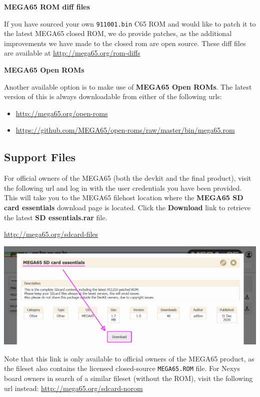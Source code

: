 \textbf{MEGA65 ROM diff files}

If you have sourced your own {\tt 911001.bin} C65 ROM and would like to patch it to the latest MEGA65 closed ROM,
we do provide patches, as the additional improvements we have made to the closed rom are open source.
These diff files are available at \url{http://mega65.org/rom-diffs}

\textbf{MEGA65 Open ROMs}

Another available option is to make use of \textbf{MEGA65 Open ROMs}. The latest version of this is always downloadable from either of the following urls:

\begin{itemize}
  \item \url{http://mega65.org/open-roms}
  \item \url{https://github.com/MEGA65/open-roms/raw/master/bin/mega65.rom}
\end{itemize}


\subsection{Support Files}

For official owners of the MEGA65 (both the devkit and the final product), visit the following url and log in with
the user credentials you have been provided. This will take you to the MEGA65 filehost location where the \textbf{MEGA65 SD card essentials} download page is located. Click the \textbf{Download} link to retrieve the latest \textbf{SD essentials.rar} file.

\url{http://mega65.org/sdcard-files}

\includegraphics[width=\linewidth]{images/latest_support_files_with_closedrom.png}

Note that this link is only available to official owners of the MEGA65 product, as the fileset also contains the licensed closed-source {\tt MEGA65.ROM} file.
\ifdefined\printmanual
\else
For Nexys board owners in search of a similar fileset (without the ROM), visit the following url instead: \url{http://mega65.org/sdcard-norom}
\fi

